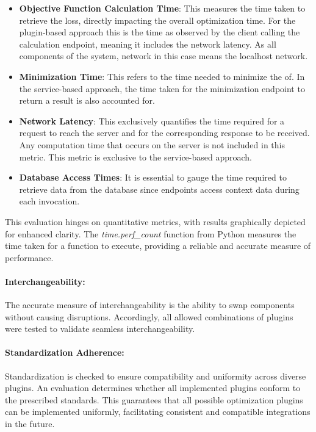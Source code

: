 \documentclass[
  a4paper,  %
  twoside,  %
  bibliography=totoc,
  headsepline,
  cleardoublepage=empty,
  parskip=half,
  draft=false
]{scrbook}
\begin{document}
\begin{itemize}
\item \textbf{Objective Function Calculation Time}: This measures the time taken to retrieve the loss, directly impacting the overall optimization time.
For the plugin-based approach this is the time as observed by the client calling the calculation endpoint, meaning it includes the network latency.
As all components of the system, network in this case means the localhost network.

\item \textbf{Minimization Time}: This refers to the time needed to minimize the \gls{of}.
In the service-based approach, the time taken for the minimization endpoint to return a result is also accounted for.

\item \textbf{Network Latency}: This exclusively quantifies the time required for a request to reach the server and for the corresponding response to be received.
Any computation time that occurs on the server is not included in this metric.
This metric is exclusive to the service-based approach.

\item \textbf{Database Access Times}: It is essential to gauge the time required to retrieve data from the database since endpoints access context data during each invocation.
\end{itemize}

This evaluation hinges on quantitative metrics, with results graphically depicted for enhanced clarity.
The \emph{time.perf\_count} function from Python measures the time taken for a function to execute, providing a reliable and accurate measure of performance.

\paragraph{Interchangeability:}
The accurate measure of interchangeability is the ability to swap components without causing disruptions.
Accordingly, all allowed combinations of plugins were tested to validate seamless interchangeability.

\paragraph{Standardization Adherence:}
Standardization is checked to ensure compatibility and uniformity across diverse plugins.
An evaluation determines whether all implemented plugins conform to the prescribed standards.
This guarantees that all possible optimization plugins can be implemented uniformly, facilitating consistent and compatible integrations in the future.
\end{document}

